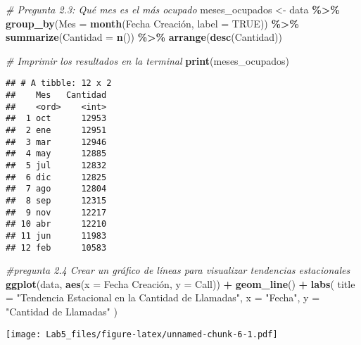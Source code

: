 \documentclass[
]{article}
\newenvironment{Shaded}{\begin{snugshade}}{\end{snugshade}}
\newcommand{\AttributeTok}[1]{\textcolor[rgb]{0.13,0.29,0.53}{#1}}
\newcommand{\CommentTok}[1]{\textcolor[rgb]{0.56,0.35,0.01}{\textit{#1}}}
\newcommand{\ConstantTok}[1]{\textcolor[rgb]{0.56,0.35,0.01}{#1}}
\newcommand{\FunctionTok}[1]{\textcolor[rgb]{0.13,0.29,0.53}{\textbf{#1}}}
\newcommand{\NormalTok}[1]{#1}
\newcommand{\OtherTok}[1]{\textcolor[rgb]{0.56,0.35,0.01}{#1}}
\newcommand{\SpecialCharTok}[1]{\textcolor[rgb]{0.81,0.36,0.00}{\textbf{#1}}}
\newcommand{\StringTok}[1]{\textcolor[rgb]{0.31,0.60,0.02}{#1}}
\begin{document}
\begin{Shaded}
\begin{Highlighting}[]
\CommentTok{\# Pregunta 2.3: Qué mes es el más ocupado}
\NormalTok{meses\_ocupados }\OtherTok{\textless{}{-}}\NormalTok{ data }\SpecialCharTok{\%\textgreater{}\%}
  \FunctionTok{group\_by}\NormalTok{(}\AttributeTok{Mes =} \FunctionTok{month}\NormalTok{(}\StringTok{\textasciigrave{}}\AttributeTok{Fecha Creación}\StringTok{\textasciigrave{}}\NormalTok{, }\AttributeTok{label =} \ConstantTok{TRUE}\NormalTok{)) }\SpecialCharTok{\%\textgreater{}\%}
  \FunctionTok{summarize}\NormalTok{(}\AttributeTok{Cantidad =} \FunctionTok{n}\NormalTok{()) }\SpecialCharTok{\%\textgreater{}\%}
  \FunctionTok{arrange}\NormalTok{(}\FunctionTok{desc}\NormalTok{(Cantidad))}

\CommentTok{\# Imprimir los resultados en la terminal}
\FunctionTok{print}\NormalTok{(meses\_ocupados)}
\end{Highlighting}
\end{Shaded}

\begin{verbatim}
## # A tibble: 12 x 2
##    Mes   Cantidad
##    <ord>    <int>
##  1 oct      12953
##  2 ene      12951
##  3 mar      12946
##  4 may      12885
##  5 jul      12832
##  6 dic      12825
##  7 ago      12804
##  8 sep      12315
##  9 nov      12217
## 10 abr      12210
## 11 jun      11983
## 12 feb      10583
\end{verbatim}

\begin{Shaded}
\begin{Highlighting}[]
\CommentTok{\#pregunta 2.4 Crear un gráfico de líneas para visualizar tendencias estacionales}
\FunctionTok{ggplot}\NormalTok{(data, }\FunctionTok{aes}\NormalTok{(}\AttributeTok{x =} \StringTok{\textasciigrave{}}\AttributeTok{Fecha Creación}\StringTok{\textasciigrave{}}\NormalTok{, }\AttributeTok{y =}\NormalTok{ Call)) }\SpecialCharTok{+}
  \FunctionTok{geom\_line}\NormalTok{() }\SpecialCharTok{+}
  \FunctionTok{labs}\NormalTok{(}
    \AttributeTok{title =} \StringTok{"Tendencia Estacional en la Cantidad de Llamadas"}\NormalTok{,}
    \AttributeTok{x =} \StringTok{"Fecha"}\NormalTok{,}
    \AttributeTok{y =} \StringTok{"Cantidad de Llamadas"}
\NormalTok{  )}
\end{Highlighting}
\end{Shaded}

\texttt{[image: Lab5\_files/figure-latex/unnamed-chunk-6-1.pdf]}
\end{document}
